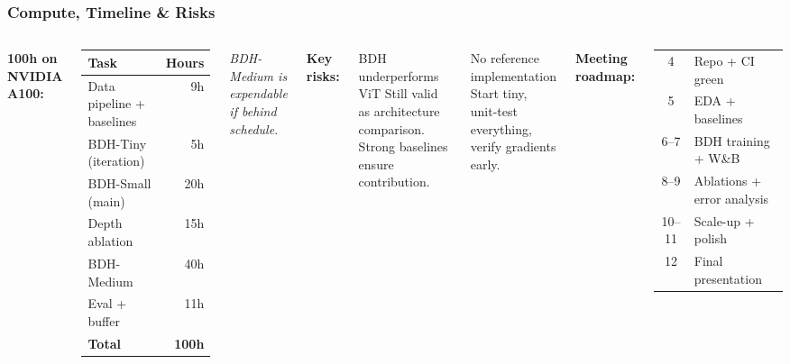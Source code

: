 \documentclass{beamer}
\begin{document}
\begin{frame}
\frametitle{Compute, Timeline \& Risks}

\begin{columns}
\textbf{100h on NVIDIA A100:}
\begin{table}
\centering
\scriptsize
\begin{tabular}{lr}
\toprule
\textbf{Task} & \textbf{Hours} \\
\midrule
Data pipeline + baselines & 9h \\
BDH-Tiny (iteration) & 5h \\
BDH-Small (main) & 20h \\
Depth ablation & 15h \\
BDH-Medium & 40h \\
Eval + buffer & 11h \\
\midrule
\textbf{Total} & \textbf{100h} \\
\bottomrule
\end{tabular}
\end{table}

\footnotesize\textit{BDH-Medium is expendable if behind schedule.}

\textbf{Key risks:}

\begin{alertblock}{\footnotesize BDH underperforms ViT}
\scriptsize Still valid as architecture comparison. Strong baselines ensure contribution.
\end{alertblock}

\begin{alertblock}{\footnotesize No reference implementation}
\scriptsize Start tiny, unit-test everything, verify gradients early.
\end{alertblock}

\vspace{0.3em}
\textbf{Meeting roadmap:}
\scriptsize
\begin{tabular}{cl}
4 & Repo + CI green \\
5 & EDA + baselines \\
6--7 & BDH training + W\&B \\
8--9 & Ablations + error analysis \\
10--11 & Scale-up + polish \\
12 & Final presentation \\
\end{tabular}
\end{columns}

\end{frame}
\end{document}
